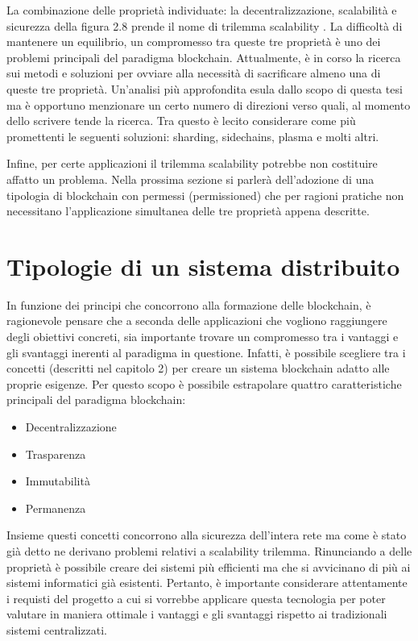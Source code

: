 La combinazione delle proprietà individuate: la decentralizzazione, scalabilità e sicurezza della figura 2.8 prende il nome di trilemma scalability . La difficoltà di mantenere un equilibrio, un compromesso tra queste tre proprietà è uno dei problemi principali del paradigma blockchain. Attualmente, è in corso la ricerca sui metodi e soluzioni per ovviare alla necessità di sacrificare almeno una di queste tre proprietà. Un’analisi più approfondita esula dallo scopo di questa tesi ma è opportuno menzionare un certo numero di direzioni verso quali, al momento dello scrivere tende la ricerca. Tra questo è lecito considerare come più promettenti le seguenti soluzioni: sharding, sidechains, plasma e molti altri.

Infine, per certe applicazioni il trilemma scalability potrebbe non costituire affatto un problema. Nella prossima sezione si parlerà dell’adozione di una tipologia di blockchain con permessi (permissioned) che per ragioni pratiche non necessitano l’applicazione simultanea delle tre proprietà appena descritte.

\section{Tipologie di un sistema distribuito} %

In funzione dei principi che concorrono alla formazione delle blockchain, è ragionevole pensare che a seconda delle applicazioni che vogliono raggiungere degli obiettivi concreti, sia importante trovare un compromesso tra i vantaggi e gli svantaggi inerenti al paradigma in questione. Infatti, è possibile scegliere tra i concetti (descritti nel capitolo 2) per creare un sistema blockchain adatto alle proprie esigenze. Per questo scopo è possibile estrapolare quattro caratteristiche principali del paradigma blockchain: 

\begin{itemize}
\item Decentralizzazione
\item Trasparenza
\item Immutabilità
\item Permanenza
\end{itemize}

Insieme questi concetti concorrono alla sicurezza dell'intera rete ma come è stato già detto ne derivano problemi relativi a scalability trilemma. Rinunciando a delle proprietà è possibile creare dei sistemi più efficienti ma che si avvicinano di più ai sistemi informatici già esistenti. Pertanto, è importante considerare attentamente i requisti del progetto a cui si vorrebbe applicare questa tecnologia per poter valutare in maniera ottimale i vantaggi e gli svantaggi rispetto ai tradizionali sistemi centralizzati.

